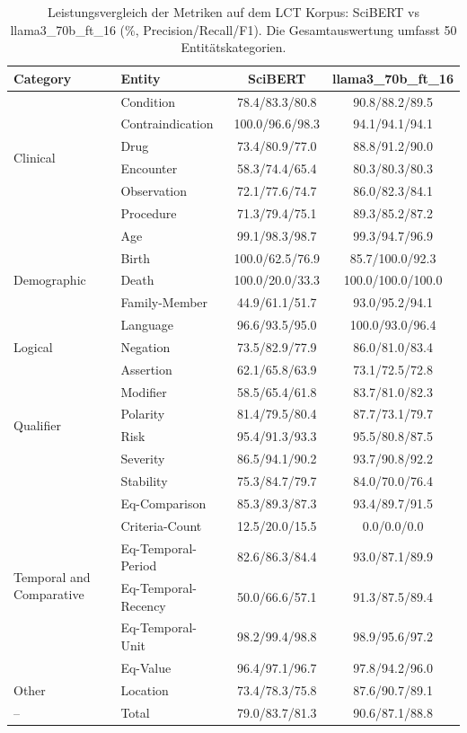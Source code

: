 
\begin{table}[htbp]
\centering
\begin{tabular}{llcc}
\toprule
\textbf{Category} & \textbf{Entity} & \textbf{SciBERT} & \textbf{llama3_70b_ft_16} \\
\midrule
\multirow{6}{*}{Clinical} & Condition & 78.4/83.3/80.8 & 90.8/88.2/89.5 \\
 & Contraindication & 100.0/96.6/98.3 & 94.1/94.1/94.1 \\
 & Drug & 73.4/80.9/77.0 & 88.8/91.2/90.0 \\
 & Encounter & 58.3/74.4/65.4 & 80.3/80.3/80.3 \\
 & Observation & 72.1/77.6/74.7 & 86.0/82.3/84.1 \\
 & Procedure & 71.3/79.4/75.1 & 89.3/85.2/87.2 \\
\midrule
\multirow{5}{*}{Demographic} & Age & 99.1/98.3/98.7 & 99.3/94.7/96.9 \\
 & Birth & 100.0/62.5/76.9 & 85.7/100.0/92.3 \\
 & Death & 100.0/20.0/33.3 & 100.0/100.0/100.0 \\
 & Family-Member & 44.9/61.1/51.7 & 93.0/95.2/94.1 \\
 & Language & 96.6/93.5/95.0 & 100.0/93.0/96.4 \\
\midrule
Logical & Negation & 73.5/82.9/77.9 & 86.0/81.0/83.4 \\
\midrule
\multirow{6}{*}{Qualifier} & Assertion & 62.1/65.8/63.9 & 73.1/72.5/72.8 \\
 & Modifier & 58.5/65.4/61.8 & 83.7/81.0/82.3 \\
 & Polarity & 81.4/79.5/80.4 & 87.7/73.1/79.7 \\
 & Risk & 95.4/91.3/93.3 & 95.5/80.8/87.5 \\
 & Severity & 86.5/94.1/90.2 & 93.7/90.8/92.2 \\
 & Stability & 75.3/84.7/79.7 & 84.0/70.0/76.4 \\
\midrule
\multirow{6}{*}{Temporal and Comparative} & Eq-Comparison & 85.3/89.3/87.3 & 93.4/89.7/91.5 \\
 & Criteria-Count & 12.5/20.0/15.5 & 0.0/0.0/0.0 \\
 & Eq-Temporal-Period & 82.6/86.3/84.4 & 93.0/87.1/89.9 \\
 & Eq-Temporal-Recency & 50.0/66.6/57.1 & 91.3/87.5/89.4 \\
 & Eq-Temporal-Unit & 98.2/99.4/98.8 & 98.9/95.6/97.2 \\
 & Eq-Value & 96.4/97.1/96.7 & 97.8/94.2/96.0 \\
\midrule
Other & Location & 73.4/78.3/75.8 & 87.6/90.7/89.1 \\
\midrule
-- & Total & 79.0/83.7/81.3 & 90.6/87.1/88.8 \\
\bottomrule
\end{tabular}
\caption{Leistungsvergleich der Metriken auf dem LCT Korpus: SciBERT vs llama3_70b_ft_16 (\%, Precision/Recall/F1). Die Gesamtauswertung umfasst 50 Entitätskategorien.}
\label{tab:metrics_comparison}
\end{table}
    
